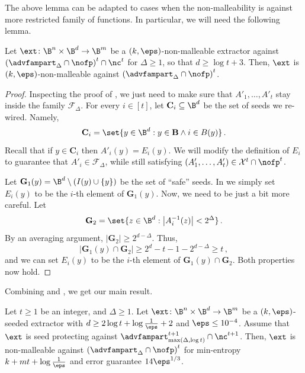 \documentclass{toc}
\begin{document}
%
%
%

The above lemma can be adapted to cases when the non-malleability is against
more restricted family of functions. In particular, we will need the following lemma.
\begin{lemma}\label{lem:nm-with-coll22} 
Let $\ext \colon \B^{n} \times \B^{d} \rightarrow \B^{m}$ be a $(k,\eps)$-non-malleable
extractor against $\left(\advfampart_{\Delta} \cap \nofp\right)^t \cap \nc^t$ for $\Delta  \ge 1$, so that $d \ge \log {t} + 3$. Then, $\ext$ is $(k,\eps)$-non-malleable
against $\left(\advfampart_{\Delta} \cap \nofp\right)^t$.
\end{lemma}
\begin{proof}
Inspecting the proof of , we just need to make sure that
$A'_{1},\ldots,A'_{t}$ stay inside the family $\mathcal{F}_{\Delta}$. For every $i \in [t]$, let
$\mathbf{C}_i \subseteq \B^d$ be the set of seeds we re-wired. Namely,
\[
\mathbf{C}_i = \set{y \in \B^d : y \in \mathbf{B} \wedge i \in B(y)}\,.
\]
Recall that if $y \in \mathbf{C}_i$ then $A'_{i}(y) = E_{i}(y)$. We will modify the definition of 
$E_{i}$ to guarantee that $A'_i \in \mathcal{F}_{\Delta}$, while still satisfying
$(A'_1,\ldots,A'_t) \in \mathcal{X}^t \cap \nofp^t$.%

Let $\mathbf{G}_1(y) = \B^{d} \setminus (I(y) \cup \{y\})$ be the set of ``safe'' seeds. In 
we simply set $E_{i}(y)$ to be the $i$-th element of $\mathbf{G}_1(y)$. Now, we need to be just a bit
more careful. Let
\[
\mathbf{G}_2 = \set{z \in \B^d: \left| A_{i}^{-1}(z) \right| < 2^{\Delta}}\,.
\]
By an averaging argument, $|\mathbf{G}_2| \ge 2^{d-\Delta}$. Thus, 
\[
\left|\mathbf{G}_1(y) \cap \mathbf{G}_2\right| \ge 2^d - t - 1 - 2^{d-\Delta} \ge t\,,
\]
and we can set $E_{i}(y)$ to be the $i$-th element of $\mathbf{G}_1(y) \cap \mathbf{G}_2$.
Both properties now hold.
\end{proof}
%
%
%
%
%
%
%
%
%
%

Combining  and , we get our main result.

\begin{corollary}\label{main:sec2}
Let $t \ge 1$ be an integer, and $\Delta \ge 1$.
Let $\ext\colon\B^{n}\times\B^{d}\rightarrow\B^m$ be a $(k,\eps)$-seeded extractor with $d \ge 2\log{t} + \log\frac1{\eps} + 2$ and $\eps \leq 10^{-4}$. Assume that $\ext$ is seed protecting against $\advfampart^{t+1}_{\max(\Delta, \log t)} \cap \nc^{t+1}$. Then, $\ext$ is non-malleable against $\left(\advfampart_{\Delta} \cap \nofp\right)^t$  for min-entropy $k+mt+\log\frac1{\eps}$ and error guarantee $14 \eps^{1/3}$.
\end{corollary}
\end{document}
